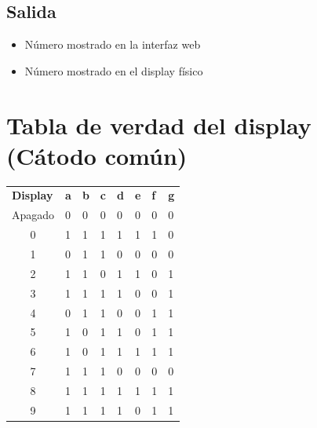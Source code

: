 \documentclass{article}
\begin{document}
    \subsection{Salida}
        \begin{itemize}
            \item Número mostrado en la interfaz web
            \item Número mostrado en el display físico
        \end{itemize}

\section{Tabla de verdad del display (Cátodo común)}
    \begin{table}[]
        \begin{tabular}{clllllll}
            \multicolumn{1}{l}{\textbf{Display}} & \textbf{a} & \textbf{b} & \textbf{c} & \textbf{d} & \textbf{e} & \textbf{f} & \textbf{g} \\
                Apagado                              & 0          & 0          & 0          & 0          & 0          & 0          & 0          \\
                0                                    & 1          & 1          & 1          & 1          & 1          & 1          & 0          \\
                1                                    & 0          & 1          & 1          & 0          & 0          & 0          & 0          \\
                2                                    & 1          & 1          & 0          & 1          & 1          & 0          & 1          \\
                3                                    & 1          & 1          & 1          & 1          & 0          & 0          & 1          \\
                4                                    & 0          & 1          & 1          & 0          & 0          & 1          & 1          \\
                5                                    & 1          & 0          & 1          & 1          & 0          & 1          & 1          \\
                6                                    & 1          & 0          & 1          & 1          & 1          & 1          & 1          \\
                7                                    & 1          & 1          & 1          & 0          & 0          & 0          & 0          \\
                8                                    & 1          & 1          & 1          & 1          & 1          & 1          & 1          \\
                9                                    & 1          & 1          & 1          & 1          & 0          & 1          & 1         
        \end{tabular}
    \end{table}
\end{document}
